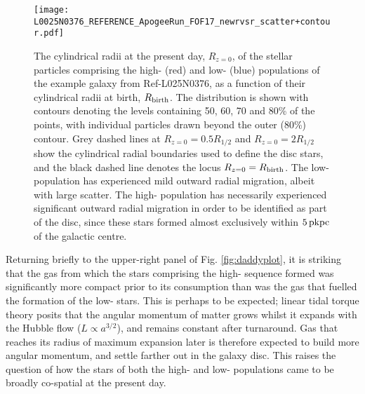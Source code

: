 \begin{figure}
\texttt{[image: L0025N0376\_REFERENCE\_ApogeeRun\_FOF17\_newrvsr\_scatter+contour.pdf]}
\caption[The change in cylindrical radius since birth of disk stars in the example galaxy from Ref-L025N376]{\label{fig:birth_vs_z0_radii} The cylindrical radii at the present day, $R_{z=0}$, of the stellar particles comprising the high- (red) and low-\afe{} (blue) populations of the example galaxy from Ref-L025N0376, as a function of their cylindrical radii at birth, $R_{\rm birth}$. The distribution is shown with contours denoting the levels containing 50, 60, 70 and 80\% of the points, with individual particles drawn beyond the outer (80\%) contour. Grey dashed lines at $R_{z=0} = 0.5R_{1/2}$ and $R_{z=0} = 2R_{1/2}$ show the cylindrical radial boundaries used to define the disc stars, and the black dashed line denotes the locus $R_{z=0} = R_{\rm birth}$. The low-\afe{} population has experienced mild outward radial migration, albeit with large scatter. The high-\afe{} population has necessarily experienced significant outward radial migration in order to be identified as part of the disc, since these stars formed almost exclusively within $5\,{\rm pkpc}$ of the galactic centre.}
\end{figure}

Returning briefly to the upper-right panel of Fig. \ref{fig:daddyplot}, it is striking that the gas from which the stars comprising the high-\afe{} sequence formed was significantly more compact prior to its consumption than was the gas that fuelled the formation of the low-\afe{} stars. This is perhaps to be expected; linear tidal torque theory \citep{1984ApJ...286...38W,1996MNRAS.282..455C} posits that the angular momentum of matter grows whilst it expands with the Hubble flow ($L \propto a^{3/2}$), and remains constant after turnaround. Gas that reaches its radius of maximum expansion later is therefore expected to build more angular momentum, and settle farther out in the galaxy disc. This raises the question of how the stars of both the high- and low-\afe{} populations came to be broadly co-spatial at the present day. 

